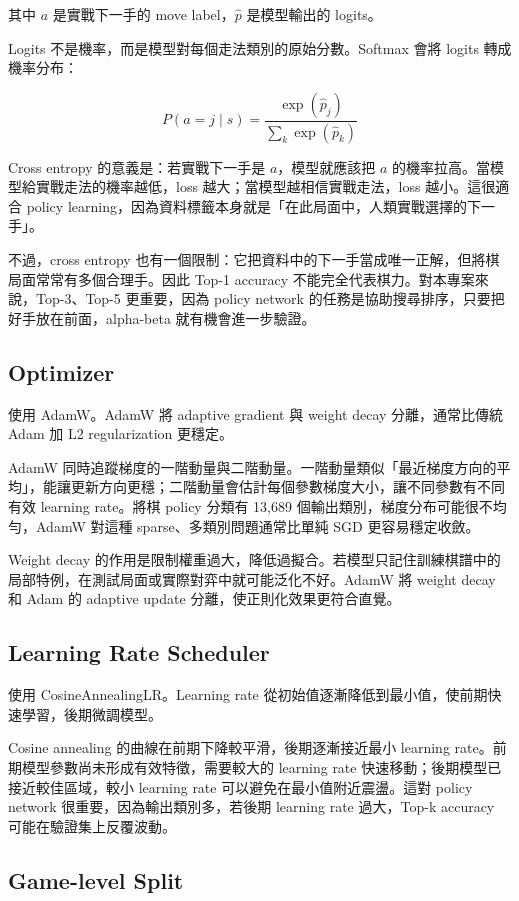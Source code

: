 \documentclass[12pt,a4paper,fontset=none]{ctexart}
\begin{document}
其中 $a$ 是實戰下一手的 move label，$\hat{p}$ 是模型輸出的 logits。

Logits 不是機率，而是模型對每個走法類別的原始分數。Softmax 會將 logits 轉成機率分布：

\[
P(a=j \mid s)
=
\frac{\exp(\hat{p}_j)}
{\sum_k \exp(\hat{p}_k)}
\]

Cross entropy 的意義是：若實戰下一手是 $a$，模型就應該把 $a$ 的機率拉高。當模型給實戰走法的機率越低，loss 越大；當模型越相信實戰走法，loss 越小。這很適合 policy learning，因為資料標籤本身就是「在此局面中，人類實戰選擇的下一手」。

不過，cross entropy 也有一個限制：它把資料中的下一手當成唯一正解，但將棋局面常常有多個合理手。因此 Top-1 accuracy 不能完全代表棋力。對本專案來說，Top-3、Top-5 更重要，因為 policy network 的任務是協助搜尋排序，只要把好手放在前面，alpha-beta 就有機會進一步驗證。

\subsection{Optimizer}

使用 AdamW。AdamW 將 adaptive gradient 與 weight decay 分離，通常比傳統 Adam 加 L2 regularization 更穩定。

AdamW 同時追蹤梯度的一階動量與二階動量。一階動量類似「最近梯度方向的平均」，能讓更新方向更穩；二階動量會估計每個參數梯度大小，讓不同參數有不同有效 learning rate。將棋 policy 分類有 13,689 個輸出類別，梯度分布可能很不均勻，AdamW 對這種 sparse、多類別問題通常比單純 SGD 更容易穩定收斂。

Weight decay 的作用是限制權重過大，降低過擬合。若模型只記住訓練棋譜中的局部特例，在測試局面或實際對弈中就可能泛化不好。AdamW 將 weight decay 和 Adam 的 adaptive update 分離，使正則化效果更符合直覺。

\subsection{Learning Rate Scheduler}

使用 CosineAnnealingLR。Learning rate 從初始值逐漸降低到最小值，使前期快速學習，後期微調模型。

Cosine annealing 的曲線在前期下降較平滑，後期逐漸接近最小 learning rate。前期模型參數尚未形成有效特徵，需要較大的 learning rate 快速移動；後期模型已接近較佳區域，較小 learning rate 可以避免在最小值附近震盪。這對 policy network 很重要，因為輸出類別多，若後期 learning rate 過大，Top-k accuracy 可能在驗證集上反覆波動。

\subsection{Game-level Split}
\end{document}
